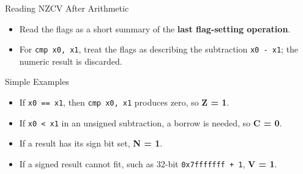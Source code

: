 \documentclass[aspectratio=169,11pt,t]{beamer}
\newcommand{\key}[1]{\textbf{#1}}
\newcommand{\code}[1]{\texttt{#1}}
\begin{document}
\begin{frame}{Reading NZCV After Arithmetic}
\begin{itemize}\setlength{\itemsep}{6pt}
  \item Read the flags as a short summary of the \key{last flag-setting operation}.
  \item For \code{cmp x0, x1}, treat the flags as describing the subtraction \code{x0 - x1}; the numeric result is discarded.
\end{itemize}

\vspace{0.25cm}
\begin{block}{Simple Examples}
\begin{itemize}\setlength{\itemsep}{5pt}
  \item If \code{x0 == x1}, then \code{cmp x0, x1} produces zero, so \key{Z = 1}.
  \item If \code{x0 < x1} in an unsigned subtraction, a borrow is needed, so \key{C = 0}.
  \item If a result has its sign bit set, \key{N = 1}.
  \item If a signed result cannot fit, such as 32-bit \code{0x7fffffff + 1}, \key{V = 1}.
\end{itemize}
\end{block}
\end{frame}






\end{document}

